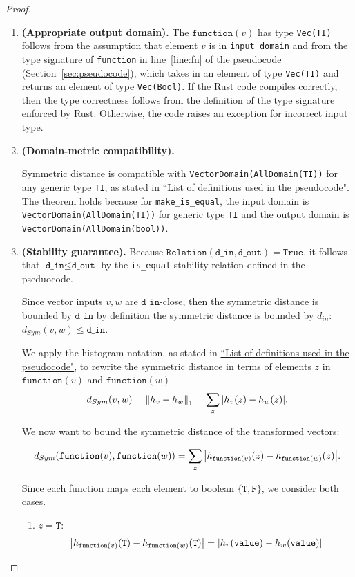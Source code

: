 \documentclass[11pt,a4paper]{article}
\newcommand{\din}{\texttt{d\_in}}
\newcommand{\dout}{\texttt{d\_out}}
\newcommand{\T}{\texttt{T} }
\newcommand{\F}{\texttt{F} }
\newcommand{\Relation}{\texttt{Relation}}
\newcommand{\function}{\texttt{function}}
\begin{document}
\begin{proof}
\begin{enumerate}
\item \textbf{(Appropriate output domain).} The $\function(v)$ has type \texttt{Vec(TI)} follows from the assumption that element $v$ is in \texttt{input\_domain} and from the type signature of \texttt{function} in line~\ref{line:fn} of the pseudocode (Section~\ref{sec:pseudocode}), which takes in an element of type \texttt{Vec(TI)} and returns an element of type \texttt{Vec(Bool)}. If the Rust code compiles correctly, then the type correctness follows from the definition of the type signature enforced by Rust. Otherwise, the code raises an exception for incorrect input type. 

\item \textbf{(Domain-metric compatibility).} 

Symmetric distance is compatible with \texttt{VectorDomain(AllDomain(TI))} for any generic type \texttt{TI}, as stated in \href{https://www.overleaf.com/project/60d215bf90b337ac02200a99}{``List of definitions used in the pseudocode"}. The theorem holds because for \texttt{make\_is\_equal}, the input domain is \texttt{VectorDomain(AllDomain(TI))} for generic type \texttt{TI} and the output domain is \texttt{VectorDomain(AllDomain(bool))}. 

\item \textbf{(Stability guarantee).} 
Because $\Relation(\din, \dout) = \texttt{True}$, it follows that $\din \leq \dout$ by the \texttt{is\_equal} stability relation defined in the pseduocode.

Since vector inputs $v, w$ are $\din$-close, then the symmetric distance is bounded by $\din$ by definition the symmetric distance is bounded by $d_{in}$: $d_{Sym}(v, w) \leq \din$.

We apply the histogram notation, as stated in \href{https://www.overleaf.com/project/60d215bf90b337ac02200a99}{``List of definitions used in the pseudocode"}, to rewrite the symmetric distance in terms of elements $z$ in $\texttt{function}(v)$ and $\texttt{function}(w)$
$$d_{Sym}(v, w) = \norm{h_v - h_w}_1 = \sum_{z} \abs{h_v(z) - h_w(z)}.$$ 

We now want to bound the symmetric distance of the transformed vectors:

$$d_{Sym}(\function(v), \function(w)) = \sum_z \abs{h_{\function(v)}(z) - h_{\function(w)}(z)}.$$

Since each function maps each element to boolean $\{ \T, \F\}$, we consider both cases. 
\begin{enumerate}
    \item $z = \T$:\\
    $$\abs{h_{\function(v)}(\T) - h_{\function(w)}(\T)} = \abs{h_v(\texttt{value}) - h_w(\texttt{value})}$$
    

\end{enumerate}
\end{enumerate}
\end{proof}
\end{document}
